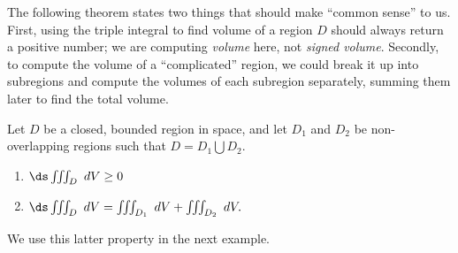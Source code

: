 The following theorem states two things that should make ``common sense'' to us. First, using the triple integral to find volume of a region $D$ should always return a positive number; we are computing \textit{volume} here, not \textit{signed volume}. Secondly, to compute the volume of a ``complicated'' region, we could break it up into subregions and compute the volumes of each subregion separately, summing them later to find the total volume.

{Let $D$ be a closed, bounded region in space, and let $D_1$ and $D_2$ be non-overlapping regions such that $D=D_1\bigcup D_2$.
\begin{enumerate}
	\item $\ds \iiint_D \ dV \geq 0$
	\item	$\ds \iiint_D\ dV = \iiint_{D_1}\ dV + \iiint_{D_2}\ dV.$\eoehere
\end{enumerate}
\mbox{}}

We use this latter property in the next example.

